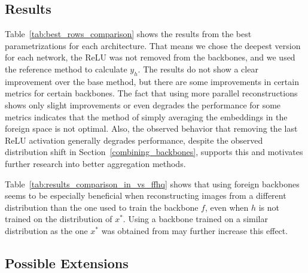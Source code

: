 \documentclass[10pt,twocolumn]{article}
\begin{document}
\subsection{Results}
Table~\ref{tab:best_rows_comparison} shows the results from the best parametrizations for each architecture.
That means we chose the deepest version for each network, the ReLU was not removed from the backbones, and we used the reference method to calculate $y_h$.
The results do not show a clear improvement over the base method, but there are some improvements in certain metrics for certain backbones.
The fact that using more parallel reconstructions shows only slight improvements or even degrades the performance for some metrics indicates that the method of simply averaging the embeddings in the foreign space is not optimal.
Also, the observed behavior that removing the last ReLU activation generally degrades performance, despite the observed distribution shift in Section~\ref{combining_backbones}, supports this and motivates further research into better aggregation methods.

Table~\ref{tab:results_comparison_in_vs_ffhq} shows that using foreign backbones seems to be especially beneficial when reconstructing images from a different distribution than the one used to train the backbone $f$, even when $h$ is not trained on the distribution of $x^*$.
Using a backbone trained on a similar distribution as the one $x^*$ was obtained from may further increase this effect.

\subsection{Possible Extensions}
\end{document}
